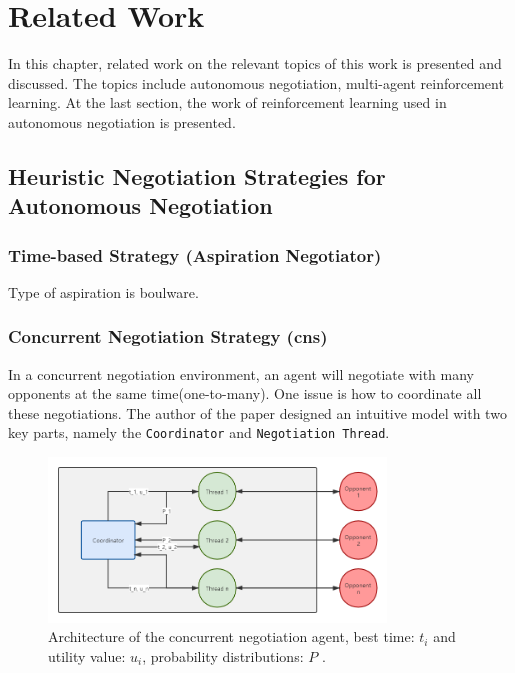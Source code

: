 \chapter{Related Work}
In this chapter, related work on the relevant topics of this work is presented and discussed. The topics include autonomous negotiation, multi-agent reinforcement learning. At the last section, the work of reinforcement learning used in autonomous negotiation is presented. 

\section{Heuristic Negotiation Strategies for Autonomous Negotiation}
\subsection{Time-based Strategy (Aspiration Negotiator)}
Type of aspiration is boulware.

\subsection{Concurrent Negotiation Strategy (\gls{cns})}
In a concurrent negotiation environment, an agent will negotiate with many opponents at the same time(one-to-many). One issue is how to coordinate all these negotiations. The author of the paper \parencite{Williams12Concurrent} designed an intuitive model with two key parts, namely the \texttt{Coordinator} and
\texttt{Negotiation Thread}. 

\begin{figure}[htbp]
\centering
\includegraphics[width=0.8\textwidth]{./images/heuristic_concurrent_negotiation.png}
\caption{Architecture of the concurrent negotiation agent, best time: $t_i$ and utility value: $u_i$, probability distributions: $P$ \parencite{Williams12Concurrent}.}
\label{fig:heuristic-concurrent-negotiation}
\end{figure}

